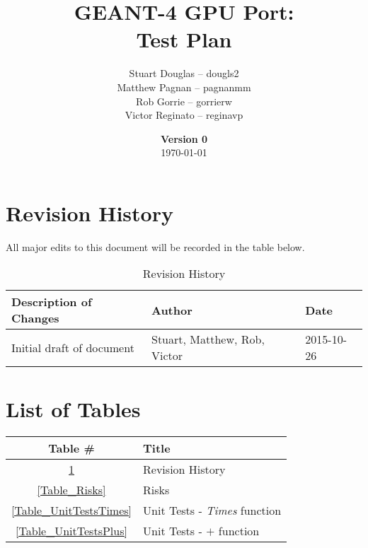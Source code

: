 \documentclass[12pt]{article}
\title{
\LARGE GEANT-4 GPU Port:
\\\vspace{10mm}
\large \textbf{Test Plan}
\vspace{40mm}
}
\author{
Stuart Douglas -- dougls2
\\Matthew Pagnan -- pagnanmm
\\Rob Gorrie -- gorrierw
\\Victor Reginato -- reginavp
\vspace{10mm}
}
\date{\vfill \textbf{Version 0}\\ \today}
\begin{document}

\maketitle
\newpage

\tableofcontents
\newpage
{}
\restoregeometry


\section*{Revision History}
All major edits to this document will be recorded in the table below.

\begin{table}[h]
\centering
\caption{Revision History}\label{Table_Revision}
\begin{tabular}{lll}
\toprule
\bf Description of Changes & \bf Author & \bf Date\\\midrule
Initial draft of document & Stuart, Matthew, Rob, Victor & 2015-10-26\\
\bottomrule
\end{tabular}
\end{table}

\section*{List of Tables}

\begin{center}
\begin{tabular}{cl}
\toprule
\bf Table \# & \bf Title\\\midrule
\ref{Table_Revision} & Revision History\\
\ref{Table_Risks} & Risks\\
\ref{Table_UnitTestsTimes} & Unit Tests - \emph{Times} function\\
\ref{Table_UnitTestsPlus} & Unit Tests - $+$ function\\
\bottomrule
\end{tabular}
\end{center}

\end{document}

